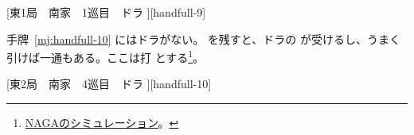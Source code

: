 \documentclass[../nankiru_main.tex]{subfiles}
\begin{document}
[東1局　南家　1巡目　ドラ ][handfull-9]

手牌~\ref{mj:handfull-10} にはドラがない。 を残すと、ドラの  が受けるし、うまく引けば一通もある。ここは打  とする\footnote{\href{https://naga.dmv.nico/htmls/69d21f40394a565f3ee6a034487617f3dee470af4e003da5777fb99e7349faa2v2_2.html?tw=2}{NAGAのシミュレーション}。}。

[東2局　南家　4巡目　ドラ ][handfull-10]
\end{document}
